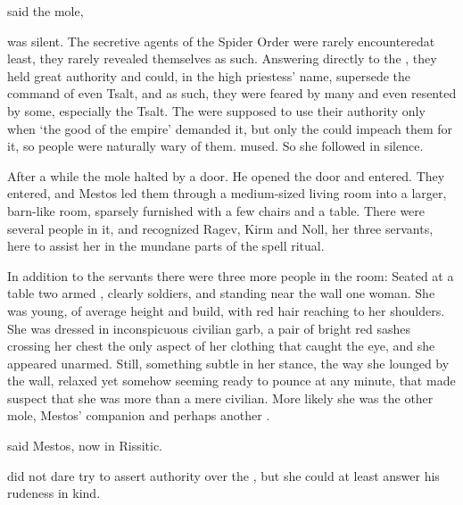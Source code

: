  said the mole,  

\Filgzed{} was silent.  The secretive agents of the Spider Order were rarely encountered\dash{}at least, they rarely revealed themselves as such. Answering directly to the \TsaltNyzleth, they held great authority and could, in the high priestess' name, supersede the command of even Tsalt, and as such, they were feared by many and even resented by some, especially the Tsalt. The \Gisshorn{} were supposed to use their authority only when `the good of the empire' demanded it, but only the \TsaltNyzleth{} could impeach them for it, so people were naturally wary of them.  \Filgzed{} mused. So she followed in silence. 

\new
After a while the mole halted by a door. He opened the door and entered.  They entered, and Mestos led them through a medium-sized living room into a larger, barn-like room, sparsely furnished with a few chairs and a table. There were several people in it, and \Filgzed{} recognized Ragev, Kirm and Noll, her three servants, here to assist her in the mundane parts of the spell ritual.  

In addition to the servants there were three more people in the room: Seated at a table two armed \scathae{}, clearly soldiers, and standing near the wall one woman. She was young, of average height and build, with red hair reaching to her shoulders. She was dressed in inconspicuous civilian garb, a pair of bright red sashes crossing her chest the only aspect of her clothing that caught the eye, and she appeared unarmed. Still, something subtle in her stance, the way she lounged by the wall, relaxed yet somehow seeming ready to pounce at any minute, that made \Filgzed{} suspect that she was more than a mere civilian. More likely she was the other mole, Mestos' companion and perhaps another \Gisshorn. 

 said Mestos, now in Rissitic. 

 \Filgzed{} did not dare try to assert authority over the \Gisshorn, but she could at least answer his rudeness in kind. %

